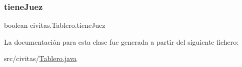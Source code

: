 \subsubsection{\texorpdfstring{tiene\+Juez}{tieneJuez}}
{\footnotesize\ttfamily boolean civitas.\+Tablero.\+tiene\+Juez\hspace{0.3cm}{\ttfamily [private]}}



La documentación para esta clase fue generada a partir del siguiente fichero\+:\begin{DoxyCompactItemize}
\item 
src/civitas/\hyperlink{Tablero_8java}{Tablero.\+java}\end{DoxyCompactItemize}
